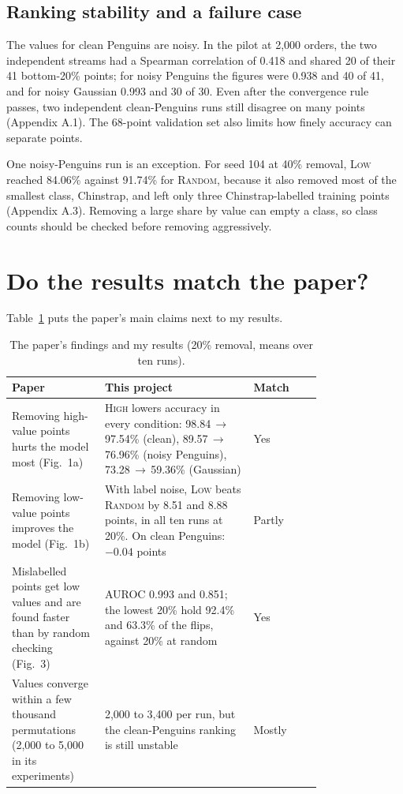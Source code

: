 \documentclass[10pt]{article}
\newcommand{\low}{\textsc{Low}}
\newcommand{\rand}{\textsc{Random}}
\newcommand{\high}{\textsc{High}}
\begin{document}
\subsection{Ranking stability and a failure case}
\label{sec:fail}
The values for clean Penguins are noisy. In the pilot at 2,000 orders, the two independent streams had a Spearman correlation of 0.418 and shared 20 of their 41 bottom-20\% points; for noisy Penguins the figures were 0.938 and 40 of 41, and for noisy Gaussian 0.993 and 30 of 30. Even after the convergence rule passes, two independent clean-Penguins runs still disagree on many points (Appendix A.1). The 68-point validation set also limits how finely accuracy can separate points.

One noisy-Penguins run is an exception. For seed 104 at 40\% removal, \low{} reached 84.06\% against 91.74\% for \rand{}, because it also removed most of the smallest class, Chinstrap, and left only three Chinstrap-labelled training points (Appendix A.3). Removing a large share by value can empty a class, so class counts should be checked before removing aggressively.

\FloatBarrier
\section{Do the results match the paper?}
\label{sec:paper}
Table~\ref{tab:paper} puts the paper's main claims next to my results.

\begin{table}[!ht]
\centering\small
\caption{The paper's findings \citep{ghorbani2019} and my results (20\% removal, means over ten runs).}
\label{tab:paper}
\begin{tabular}{@{}>{\raggedright}p{0.30\linewidth}>{\raggedright}p{0.48\linewidth}l@{}}
\toprule
Paper & This project & Match \tabularnewline
\midrule
Removing high-value points hurts the model most (Fig.~1a) & \high{} lowers accuracy in every condition: 98.84\,$\to$\,97.54\% (clean), 89.57\,$\to$\,76.96\% (noisy Penguins), 73.28\,$\to$\,59.36\% (Gaussian) & Yes \tabularnewline
\addlinespace
Removing low-value points improves the model (Fig.~1b) & With label noise, \low{} beats \rand{} by 8.51 and 8.88 points, in all ten runs at 20\%. On clean Penguins: $-0.04$ points & Partly \tabularnewline
\addlinespace
Mislabelled points get low values and are found faster than by random checking (Fig.~3) & AUROC 0.993 and 0.851; the lowest 20\% hold 92.4\% and 63.3\% of the flips, against 20\% at random & Yes \tabularnewline
\addlinespace
Values converge within a few thousand permutations (2,000 to 5,000 in its experiments) & 2,000 to 3,400 per run, but the clean-Penguins ranking is still unstable & Mostly \tabularnewline
\bottomrule
\end{tabular}
\end{table}
\end{document}
